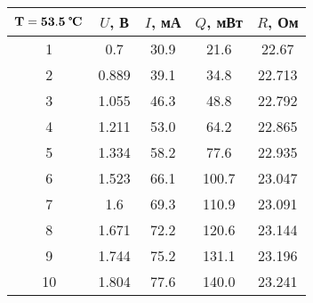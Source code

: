 \begin{tabular}{ccccc}
\toprule
$\mathbf{T = 53.5}\;\textbf{\textcelsius}$ & $U$, В & $I$, мА & $Q$, мВт & $R$, Ом \\
\midrule
1 & 0.7 & 30.9 & 21.6 & 22.67 \\
2 & 0.889 & 39.1 & 34.8 & 22.713 \\
3 & 1.055 & 46.3 & 48.8 & 22.792 \\
4 & 1.211 & 53.0 & 64.2 & 22.865 \\
5 & 1.334 & 58.2 & 77.6 & 22.935 \\
6 & 1.523 & 66.1 & 100.7 & 23.047 \\
7 & 1.6 & 69.3 & 110.9 & 23.091 \\
8 & 1.671 & 72.2 & 120.6 & 23.144 \\
9 & 1.744 & 75.2 & 131.1 & 23.196 \\
10 & 1.804 & 77.6 & 140.0 & 23.241 \\
\bottomrule
\end{tabular}
